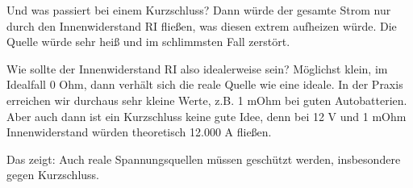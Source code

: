 \begin{frame}
{Und was passiert bei einem Kurzschluss?
Dann würde der gesamte Strom nur durch den Innenwiderstand RI fließen, was diesen extrem aufheizen würde.
Die Quelle würde sehr heiß und im schlimmsten Fall zerstört.

Wie sollte der Innenwiderstand RI also idealerweise sein?
Möglichst klein, im Idealfall 0 Ohm, dann verhält sich die reale Quelle wie eine ideale.
In der Praxis erreichen wir durchaus sehr kleine Werte, z.B. 1 mOhm bei guten Autobatterien.
Aber auch dann ist ein Kurzschluss keine gute Idee, denn bei 12 V und 1 mOhm Innenwiderstand würden theoretisch 12.000 A fließen.

Das zeigt: Auch reale Spannungsquellen müssen geschützt werden, insbesondere gegen Kurzschluss.
}

 \end{frame}


